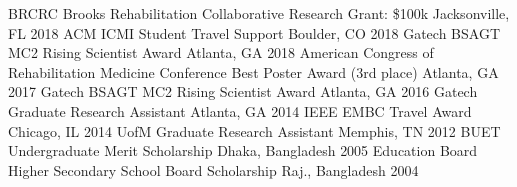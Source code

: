 \begin{cvhonors}
\cvhonor
    {BRCRC}
    {Brooks Rehabilitation Collaborative Research Grant: \$100k}
    {Jacksonville, FL}
    {2018}
\cvhonor
    {ACM}
    {ICMI Student Travel Support}
    {Boulder, CO}
    {2018}
\cvhonor
    {Gatech}
    {BSAGT MC2 Rising Scientist Award}
    {Atlanta, GA}
    {2018}
\cvhonor
    {American Congress of Rehabilitation Medicine Conference}
    {Best Poster Award (3rd place)}
    {Atlanta, GA}
    {2017}
\cvhonor
    {Gatech}
    {BSAGT MC2 Rising Scientist Award}
    {Atlanta, GA}
    {2016}
  \cvhonor
    {Gatech}
    {Graduate Research Assistant}
    {Atlanta, GA}
    {2014}
  \cvhonor
    {IEEE}
    {EMBC Travel Award}
    {Chicago, IL}
    {2014}
  \cvhonor
    {UofM}
    {Graduate Research Assistant}
    {Memphis, TN}
    {2012}
  \cvhonor
    {BUET}
    {Undergraduate Merit Scholarship}
    {Dhaka, Bangladesh}
    {2005}
    \cvhonor
    {Education Board}
    {Higher Secondary School Board Scholarship}
    {Raj., Bangladesh}
    {2004}
\end{cvhonors}

